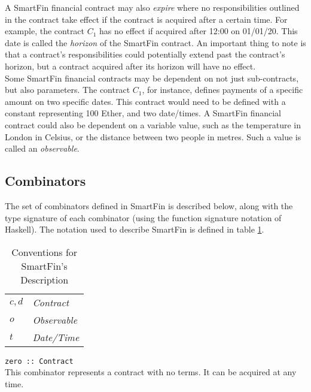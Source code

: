 \documentclass{article}
\begin{document}
A SmartFin financial contract may also \textit{expire} where no responsibilities outlined in the contract take effect if the contract is acquired after a certain time. For example, the contract $C_1$ has no effect if acquired after 12:00 on 01/01/20. This date is called the \textit{horizon} of the SmartFin contract. An important thing to note is that a contract's responsibilities could potentially extend past the contract's horizon, but a contract acquired after its horizon will have no effect. \\

Some SmartFin financial contracts may be dependent on not just sub-contracts, but also parameters. The contract $C_1$, for instance, defines payments of a specific amount on two specific dates. This contract would need to be defined with a constant representing 100 Ether, and two date/times. A SmartFin financial contract could also be dependent on a variable value, such as the temperature in London in Celsius, or the distance between two people in metres. Such a value is called an \textit{observable}.

\subsection{Combinators} \label{UG:combinators}

The set of combinators defined in SmartFin is described below, along with the type signature of each combinator (using the function signature notation of Haskell). The notation used to describe SmartFin is defined in table \ref{UG:dsl-notation}. \\

\begin{table}[ht]
    \begin{center}
        \begin{tabular}{|ll|}
            \hline
            $c, d$ &\textit{Contract} \\
            $o$ &\textit{Observable} \\
            $t$ &\textit{Date/Time} \\
            \hline
        \end{tabular}
        \caption{Conventions for SmartFin's Description}
        \label{UG:dsl-notation}
    \end{center}
\end{table}

\parbox{\textwidth}{
\texttt{zero :: Contract} \\

This combinator represents a contract with no terms. It can be acquired at any time. \\ \\

}
\end{document}
